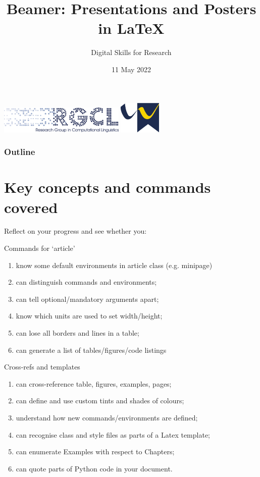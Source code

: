 \documentclass[11pt]{beamer} %
\author{Digital Skills for Research}
\title{Beamer: Presentations and Posters in \LaTeX}
\institute{Day 2, part 3 \\University of Malaga}
\date{11 May 2022}
\begin{document}
	
	\begin{frame}[plain]
		\includegraphics[width=60mm]{pics/RGCL}%
		\hfill
		\includegraphics[width=20mm]{pics/wlv-flag}%
		\maketitle %
	\end{frame}

	\begin{frame}[plain]
		\frametitle{Outline}
		\tableofcontents
	\end{frame}


\section[Revision]{Key concepts and commands covered}

\begin{frame}[plain,shrink=1]{Reflect on your progress and see whether you:}


\begin{block}{Commands for `article'}
	\begin{enumerate}
		\item know some default environments in article class (e.g. minipage)
		\item can distinguish commands and environments;
		\item can tell optional/mandatory arguments apart;
		\item know which units are used to set width/height;
		\item can lose all borders and lines in a table;
		\item can generate a list of tables/figures/code listings
	\end{enumerate}
\end{block}
%
\begin{block}{Cross-refs and templates}
	\begin{enumerate}
		\item can cross-reference table, figures, examples, pages;
		\item can define and use custom tints and shades of colours;
		\item understand how new commands/environments are defined;
		\item can recognise class and style files as parts of a Latex template;
		\item can enumerate Examples with respect to Chapters;
		\item can quote parts of Python code in your document.
	\end{enumerate}
\end{block}
\end{frame}
\end{document}
